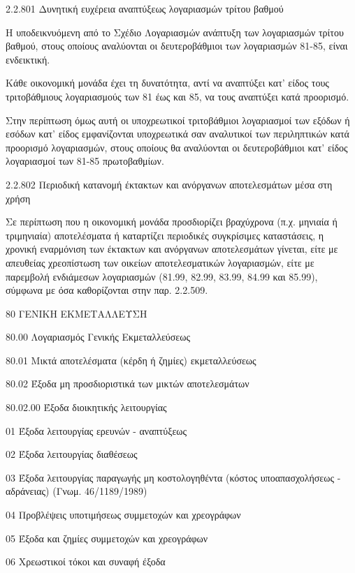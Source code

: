 \documentclass[A4,10pt,greek]{book}
\begin{document}
2.2.801 Δυνητική ευχέρεια αναπτύξεως λογαριασμών τρίτου βαθμού

Η υποδεικνυόμενη από το Σχέδιο Λογαριασμών ανάπτυξη των λογαριασμών τρίτου βαθμού, στους οποίους αναλύονται οι δευτεροβάθμιοι των λογαριασμών 81-85, είναι ενδεικτική.

Κάθε οικονομική μονάδα έχει τη δυνατότητα, αντί να αναπτύξει κατ' είδος τους τριτοβάθμιους λογαριασμούς των 81 έως και 85, να τους αναπτύξει κατά προορισμό.

Στην περίπτωση όμως αυτή οι υποχρεωτικοί τριτοβάθμιοι λογαριασμοί των εξόδων ή εσόδων κατ' είδος εμφανίζονται υποχρεωτικά σαν αναλυτικοί των περιληπτικών κατά προορισμό λογαριασμών, στους οποίους θα αναλύονται οι δευτεροβάθμιοι κατ' είδος λογαριασμοί των 81-85 πρωτοβαθμίων.

2.2.802 Περιοδική κατανομή έκτακτων και ανόργανων αποτελεσμάτων μέσα στη χρήση

Σε περίπτωση που η οικονομική μονάδα προσδιορίζει βραχύχρονα (π.χ. μηνιαία ή τριμηνιαία) αποτελέσματα ή καταρτίζει περιοδικές συγκρίσιμες καταστάσεις, η χρονική εναρμόνιση των έκτακτων και ανόργανων αποτελεσμάτων γίνεται, είτε με απευθείας χρεοπίστωση των οικείων αποτελεσματικών λογαριασμών, είτε με παρεμβολή ενδιάμεσων λογαριασμών (81.99, 82.99, 83.99, 84.99 και 85.99), σύμφωνα με όσα καθορίζονται στην παρ. 2.2.509.

80    ΓΕΝΙΚΗ ΕΚΜΕΤΑΛΛΕΥΣΗ

        80.00    Λογαριασμός Γενικής Εκμεταλλεύσεως

        80.01    Μικτά αποτελέσματα (κέρδη ή ζημίες) εκμεταλλεύσεως

        80.02    Έξοδα μη προσδιοριστικά των μικτών αποτελεσμάτων

                     80.02.00    Έξοδα διοικητικής λειτουργίας

                               01    Έξοδα λειτουργίας ερευνών - αναπτύξεως

                               02    Έξοδα λειτουργίας διαθέσεως

                               03    Έξοδα λειτουργίας παραγωγής μη κοστολογηθέντα
                                       (κόστος υποαπασχολήσεως - αδράνειας) (Γνωμ. 46/1189/1989)

                               04    Προβλέψεις υποτιμήσεως συμμετοχών και χρεογράφων

                               05    Έξοδα και ζημίες συμμετοχών και χρεογράφων

                               06    Χρεωστικοί τόκοι και συναφή έξοδα
\end{document}
